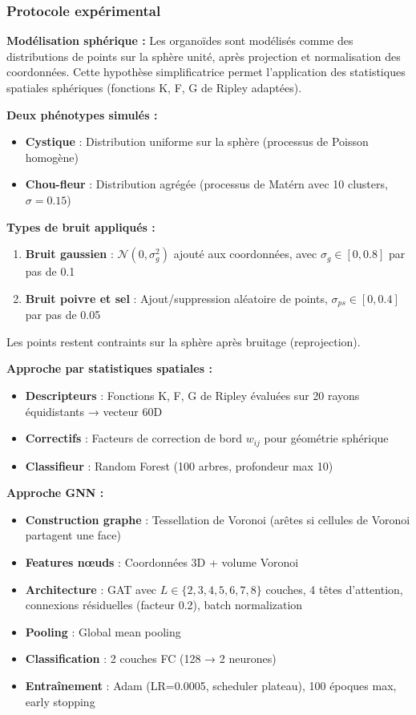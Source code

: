 \subsubsection{Protocole expérimental}

\textbf{Modélisation sphérique :}
Les organoïdes sont modélisés comme des distributions de points sur la sphère unité, après projection et normalisation des coordonnées. Cette hypothèse simplificatrice permet l'application des statistiques spatiales sphériques (fonctions K, F, G de Ripley adaptées).

\textbf{Deux phénotypes simulés :}
\begin{itemize}
    \item \textbf{Cystique} : Distribution uniforme sur la sphère (processus de Poisson homogène)
    \item \textbf{Chou-fleur} : Distribution agrégée (processus de Matérn avec 10 clusters, $\sigma = 0.15$)
\end{itemize}

\textbf{Types de bruit appliqués :}
\begin{enumerate}
    \item \textbf{Bruit gaussien} : $\mathcal{N}(0, \sigma_g^2)$ ajouté aux coordonnées, avec $\sigma_g \in [0, 0.8]$ par pas de 0.1
    \item \textbf{Bruit poivre et sel} : Ajout/suppression aléatoire de points, $\sigma_{ps} \in [0, 0.4]$ par pas de 0.05
\end{enumerate}

Les points restent contraints sur la sphère après bruitage (reprojection).

\textbf{Approche par statistiques spatiales :}
\begin{itemize}
    \item \textbf{Descripteurs} : Fonctions K, F, G de Ripley évaluées sur 20 rayons équidistants → vecteur 60D
    \item \textbf{Correctifs} : Facteurs de correction de bord $w_{ij}$ pour géométrie sphérique
    \item \textbf{Classifieur} : Random Forest (100 arbres, profondeur max 10)
\end{itemize}

\textbf{Approche GNN :}
\begin{itemize}
    \item \textbf{Construction graphe} : Tessellation de Voronoi (arêtes si cellules de Voronoi partagent une face)
    \item \textbf{Features nœuds} : Coordonnées 3D + volume Voronoi
    \item \textbf{Architecture} : GAT avec $L \in \{2, 3, 4, 5, 6, 7, 8\}$ couches, 4 têtes d'attention, connexions résiduelles (facteur 0.2), batch normalization
    \item \textbf{Pooling} : Global mean pooling
    \item \textbf{Classification} : 2 couches FC (128 → 2 neurones)
    \item \textbf{Entraînement} : Adam (LR=0.0005, scheduler plateau), 100 époques max, early stopping
\end{itemize}

